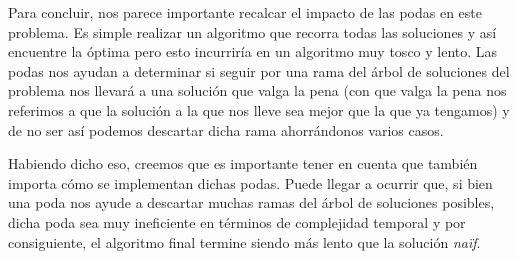 Para concluir, nos parece importante recalcar el impacto de las podas en este problema. Es simple realizar un algoritmo que recorra todas las soluciones y así encuentre la óptima pero esto incurriría en un algoritmo muy tosco y lento. Las podas nos ayudan a determinar si seguir por una rama del árbol de soluciones del problema nos llevará a una solución que valga la pena (con que valga la pena nos referimos a que la solución a la que nos lleve sea mejor que la que ya tengamos) y de no ser así podemos descartar dicha rama ahorrándonos varios casos.

Habiendo dicho eso, creemos que es importante tener en cuenta que también importa cómo se implementan dichas podas. Puede llegar a ocurrir que, si bien una poda nos ayude a descartar muchas ramas del árbol de soluciones posibles, dicha poda sea muy ineficiente en términos de complejidad temporal y por consiguiente, el algoritmo final termine siendo más lento que la solución \emph{naïf}.